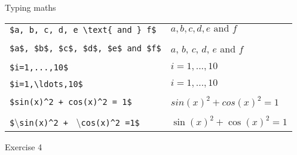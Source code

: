 \begin{frame}[fragile]{Typing maths}
  \begin{table}
    \centering
    \begin{tabular}{ll}
      \color{red}\lstinline|$a, b, c, d, e \text{ and } f$| \hspace{1cm} &
        \color{red}$a, b, c, d, e \text{ and } f$ \\ & \\
      \color{mLightGreen}\lstinline|$a$, $b$, $c$, $d$, $e$ and $f$| &
        \color{mLightGreen}$a$, $b$, $c$, $d$, $e$ and $f$\hspace{1cm}\\& \\
      \color{red}\lstinline|$i=1,...,10$| &
        \color{red}$i=1,...,10$ \\ & \\
      \color{mLightGreen}\lstinline|$i=1,\ldots,10$| &
        \color{mLightGreen}$i=1,\ldots,10$ \\ & \\
      \color{red}\lstinline|$sin(x)^2 + cos(x)^2 = 1$| &
        \color{red}$sin(x)^2 + cos(x)^2 = 1$ \\ & \\
      \color{mLightGreen}\lstinline|$|\textbackslash\lstinline|sin(x)^2 + |
        \textbackslash\lstinline|cos(x)^2 =1|\lstinline|$| &
        \color{mLightGreen}$\sin(x)^2 + \cos(x)^2 = 1$ \\
    \end{tabular}
  \end{table}
\end{frame}

\begin{frame}[standout]
  Exercise 4
\end{frame}
